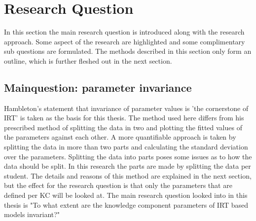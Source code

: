 \documentclass{scrartcl}
\begin{document}

\section{Research Question}
\label{sec:RQ}
In this section the main research question is introduced along with the research approach. Some aspect of the research are highlighted and some complimentary sub questions are formulated. The methods described in this section only form an outline, which is further fleshed out in the next section.

\subsection{Mainquestion: parameter invariance}
Hambleton's statement that invariance of parameter values is 'the cornerstone of IRT' is taken as the basis for this thesis. The method used here differs from his prescribed method of splitting the data in two and plotting the fitted values of the parameters against each other. A more quantifiable approach is taken by splitting the data in more than two parts and calculating the standard deviation over the parameters. Splitting the data into parts poses some issues as to how the data should be split. In this research the parts are made by splitting the data per student. The details and reasons of this method are explained in the next section, but the effect for the research question is that only the parameters that are defined per KC will be looked at. The main research question looked into in this thesis is "To what extent are the knowledge component parameters of IRT based models invariant?"
\end{document}
